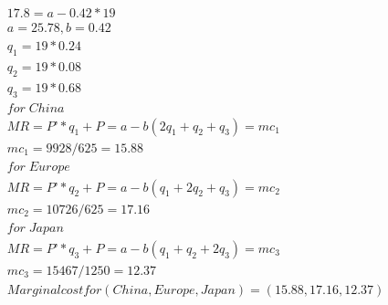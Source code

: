 \documentclass[a4paper]{article}
\begin{document}
    \begin{answer}[Shipbuilding (1)]
    \begin{align*}
        & 17.8 = a-0.42*19 \\ 
        & a = 25.78, b = 0.42 \\ 
        & q_1 = 19*0.24 \\
        & q_2 = 19*0.08 \\
        & q_3 = 19*0.68 \\
        & for \; China \\
        & MR = P’*q_1+P = a-b(2q_1+q_2+q_3) = mc_1 \\  
        & mc_1 = 9928/625 = 15.88 \\
        & for \; Europe \\ 
        & MR = P’*q_2+P = a-b(q_1+2q_2+q_3) = mc_2 \\  
        & mc_2 = 10726/625 = 17.16 \\
        & for \; Japan \\
        & MR = P’*q_3+P = a-b(q_1+q_2+2q_3) = mc_3 \\   
        & mc_3 = 15467/1250 = 12.37 \\
        & Marginal cost for (China, Europe, Japan) = (15.88, 17.16, 12.37) \\ 
        \end{align*}



    \end{answer}
    
\end{document}
